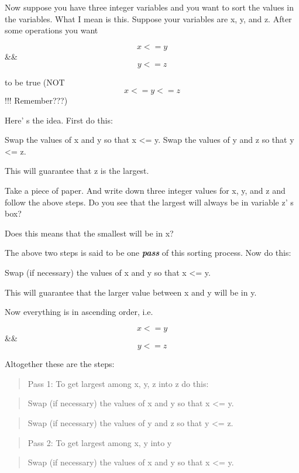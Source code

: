 Now suppose you have three integer variables and you want to sort the
values in the variables. What I mean is this. Suppose your variables are
x, y, and z. After some operations you want

\[x  <=  y\]  \&\&  \[y  <=  z\]

to be true (NOT \[x <= y <= z\] !!! Remember???)

Here' s the idea. First do this:\\
\begin{tightlist}
\li
  Swap the values of x and y so that x <= y.
\li
  Swap the values of y and z so that y <= z.
\end{tightlist}
This will guarantee that z is the largest.

\begin{ex}
Take a piece of paper. And write down three integer values for x, y, and z and follow the above steps. Do you see that the largest will always be in variable z' s box?
\end{ex}

\begin{ex}
Does this means that the smallest will be in x?
\end{ex}

The above two steps is said to be one \textit{\textbf{pass}} of this sorting process. Now do this:
\begin{tightlist}
\li
  Swap (if necessary) the values of x and y so that x <= y.
\end{tightlist}

This will guarantee that the larger value between x and y will be in y.

Now everything is in ascending order, i.e.

\[x  <=  y\]  \&\&  \[y  <=  z\]

Altogether these are the steps:

\begin{quote}
Pass 1: To get largest among x, y, z into z do this:
\end{quote}
\begin{tightlist}
\li
  \begin{quote}
  Swap (if necessary) the values of x and y so that x <= y.
  \end{quote}
\li
  \begin{quote}
  Swap (if necessary) the values of y and z so that y <= z.
  \end{quote}
\end{tightlist}
\begin{quote}
Pass 2: To get largest among x, y into y
\end{quote}
\begin{tightlist}
\li
  \begin{quote}
  Swap (if necessary) the values of x and y so that x <= y.
  \end{quote}
\end{tightlist}

